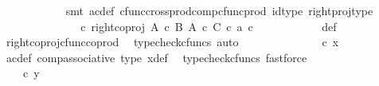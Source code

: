 \begin{isabellebody}
\ \ \ \ \ \ \ \ \ \ \isamarkupfalse%
\ {\isacharparenleft}{\kern0pt}smt\ ac{\isacharunderscore}{\kern0pt}def\ cfunc{\isacharunderscore}{\kern0pt}cross{\isacharunderscore}{\kern0pt}prod{\isacharunderscore}{\kern0pt}comp{\isacharunderscore}{\kern0pt}cfunc{\isacharunderscore}{\kern0pt}prod\ id{\isacharunderscore}{\kern0pt}type\ right{\isacharunderscore}{\kern0pt}proj{\isacharunderscore}{\kern0pt}type{\isacharparenright}{\kern0pt}\isanewline
\ \ \ \ \ \ \ \ \isamarkupfalse%
\ \isamarkupfalse%
\ {\isachardoublequoteopen}{\isachardot}{\kern0pt}{\isachardot}{\kern0pt}{\isachardot}{\kern0pt}\ {\isacharequal}{\kern0pt}\ {\isacharparenleft}{\kern0pt}{\isasymphi}\ {\isasymcirc}\isactrlsub c\ right{\isacharunderscore}{\kern0pt}coproj\ {\isacharparenleft}{\kern0pt}A\ {\isasymtimes}\isactrlsub c\ B{\isacharparenright}{\kern0pt}\ {\isacharparenleft}{\kern0pt}A\ {\isasymtimes}\isactrlsub c\ C{\isacharparenright}{\kern0pt}{\isacharparenright}{\kern0pt}\ {\isasymcirc}\isactrlsub c\ {\isasymlangle}a{\isacharcomma}{\kern0pt}\ c{\isasymrangle}{\isachardoublequoteclose}\isanewline
\ \ \ \ \ \ \ \ \ \ \isamarkupfalse%
\ {\isasymphi}{\isacharunderscore}{\kern0pt}def\ \isamarkupfalse%
\ right{\isacharunderscore}{\kern0pt}coproj{\isacharunderscore}{\kern0pt}cfunc{\isacharunderscore}{\kern0pt}coprod\ \isamarkupfalse%
\ {\isacharparenleft}{\kern0pt}typecheck{\isacharunderscore}{\kern0pt}cfuncs{\isacharcomma}{\kern0pt}\ auto{\isacharparenright}{\kern0pt}\isanewline
\ \ \ \ \ \ \ \ \isamarkupfalse%
\ \isamarkupfalse%
\ {\isachardoublequoteopen}{\isachardot}{\kern0pt}{\isachardot}{\kern0pt}{\isachardot}{\kern0pt}\ {\isacharequal}{\kern0pt}\ {\isasymphi}\ {\isasymcirc}\isactrlsub c\ x{\isachardoublequoteclose}\isanewline
\ \ \ \ \ \ \ \ \ \ \isamarkupfalse%
\ ac{\isacharunderscore}{\kern0pt}def\ comp{\isacharunderscore}{\kern0pt}associative{}\ {\isasymphi}{\isacharunderscore}{\kern0pt}type\ x{\isacharprime}{\kern0pt}{\isacharunderscore}{\kern0pt}def\ \isamarkupfalse%
\ {\isacharparenleft}{\kern0pt}typecheck{\isacharunderscore}{\kern0pt}cfuncs{\isacharcomma}{\kern0pt}\ fastforce{\isacharparenright}{\kern0pt}\isanewline
\ \ \ \ \ \ \ \ \isamarkupfalse%
\ \isamarkupfalse%
\ {\isachardoublequoteopen}{\isachardot}{\kern0pt}{\isachardot}{\kern0pt}{\isachardot}{\kern0pt}\ {\isacharequal}{\kern0pt}\ {\isasymphi}\ {\isasymcirc}\isactrlsub c\ y{\isachardoublequoteclose}\isanewline
\ \ \ \ \ \ \ \ \ \ \isamarkupfalse%

\end{isabellebody}
